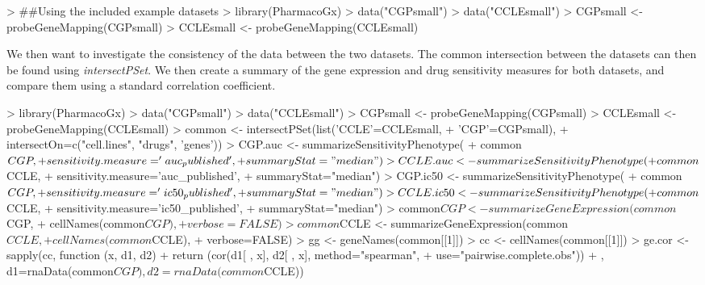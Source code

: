 \documentclass[11pt]{article}
\begin{document}
\begin{Schunk}
\begin{Sinput}
>   ##Using the included example datasets
>   library(PharmacoGx)
>   data("CGPsmall")
>   data("CCLEsmall")
>   CGPsmall <- probeGeneMapping(CGPsmall) 
>   CCLEsmall <- probeGeneMapping(CCLEsmall) 
\end{Sinput}
\end{Schunk}

We then want to investigate the consistency of the data between the two datasets. The common intersection between the datasets can then be found using \textit{intersectPSet}. We then create a summary of the gene expression and drug sensitivity measures for both datasets, and compare them using a standard correlation coefficient. 

\begin{Schunk}
\begin{Sinput}
>   library(PharmacoGx)
>   data("CGPsmall")
>   data("CCLEsmall")
>   CGPsmall <- probeGeneMapping(CGPsmall) 
>   CCLEsmall <- probeGeneMapping(CCLEsmall) 
>   common <- intersectPSet(list('CCLE'=CCLEsmall,
+                                'CGP'=CGPsmall),
+                           intersectOn=c("cell.lines", "drugs", 'genes'))
>   CGP.auc <- summarizeSensitivityPhenotype(
+                 common$CGP, 
+                 sensitivity.measure='auc_published', 
+                 summaryStat="median")
>   CCLE.auc <- summarizeSensitivityPhenotype(
+                 common$CCLE, 
+                 sensitivity.measure='auc_published', 
+                 summaryStat="median")
>   CGP.ic50 <- summarizeSensitivityPhenotype(
+                 common$CGP, 
+                 sensitivity.measure='ic50_published', 
+                 summaryStat="median")
>   CCLE.ic50 <- summarizeSensitivityPhenotype(
+                 common$CCLE, 
+                 sensitivity.measure='ic50_published', 
+                 summaryStat="median")
>   common$CGP <- summarizeGeneExpression(common$CGP, 
+                                         cellNames(common$CGP),
+                                         verbose=FALSE)
>   common$CCLE <- summarizeGeneExpression(common$CCLE, 
+                                          cellNames(common$CCLE),
+                                          verbose=FALSE)
>   gg <- geneNames(common[[1]])
>   cc <- cellNames(common[[1]])
>   ge.cor <- sapply(cc, function (x, d1, d2) {
+     return (cor(d1[ , x], d2[ , x], method="spearman",
+                 use="pairwise.complete.obs"))
+   }, d1=rnaData(common$CGP), d2=rnaData(common$CCLE))

\end{Sinput}
\end{Schunk}
\end{document}
